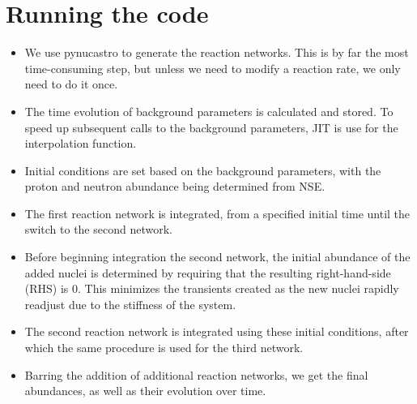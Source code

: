 \section{Running the code}
\label{sec:structure}

\begin{itemize}
    \item We use pynucastro to generate the reaction networks. This is by far the most time-consuming step, but unless we need to modify a reaction rate, we only need to do it once.
    \item The time evolution of background parameters is calculated and stored. To speed up subsequent calls to the background parameters, JIT is use for the interpolation function.
    \item Initial conditions are set based on the background parameters, with the proton and neutron abundance being determined from NSE.
    \item The first reaction network is integrated, from a specified initial time until the switch to the second network. 
    \item Before beginning integration the second network, the initial abundance of the added nuclei is determined by requiring that the resulting right-hand-side (RHS) is 0. This minimizes the transients created as the new nuclei rapidly readjust due to the stiffness of the system.
    \item The second reaction network is integrated using these initial conditions, after which the same procedure is used for the third network.
    \item Barring the addition of additional reaction networks, we get the final abundances, as well as their evolution over time.
\end{itemize}

